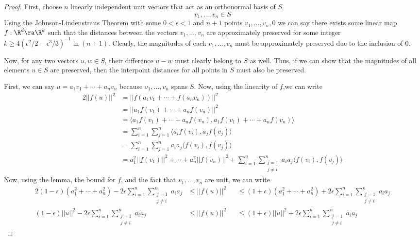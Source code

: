 \documentclass{article}
\newcommand{\innerproduct}[2]{\langle #1, #2 \rangle}
\begin{document}
\begin{proof}
    First, choose $n$ linearly independent unit vectors that act as an orthonormal basis of $S$
    \[v_1,\ldots,v_n \in S \]
    Using the Johnson-Lindenstraus Theorem 
    with some $0 < \epsilon < 1$ and $n+1$ points $v_1,\ldots,v_n,0$
    we can say there exists some linear map $f: \R^d \ra \R^k$ such that the 
    distances between the vectors $v_1,\ldots,v_n$ are approximately preserved for some 
    integer $k \geq 4(\epsilon^2 / 2 - \epsilon^3 / 3)^{-1}\ln{(n+1)}$. Clearly, the 
    magnitudes of each $v_1,\ldots,v_n$ must be approximately preserved due to the inclusion of 0.
    
    Now, for any two vectors $u,w \in S$, their difference $u-w$ must clearly belong to $S$ 
    as well. Thus, if we can show that the magnitudes of all elements $u \in S$ are preserved,
    then the interpoint distances for all points in $S$ must also be preserved. 
    
    First, we can say $u = a_1v_1 + \cdots + a_{n}v_n$ because $v_1,\ldots,v_n$ spans $S$. Now, 
    using the linearity of $f$,we can write
    \begin{alignat*}{2}
        ||f(u)||^2 &= ||f(a_1v_1 + \cdots + f(a_{n}v_n))||^2 \\
        &= ||a_1f(v_1) + \cdots + a_{n}f(v_n)||^2 \\
        &= \innerproduct{a_1f(v_1) + \cdots + a_{n}f(v_n)}{a_1f(v_1) + \cdots + a_{n}f(v_n)} \\
        &= \sum_{i=1}^{n}\sum_{j=1}^{n}\innerproduct{a_{i}f(v_i)}{a_{j}f(v_j)} \\
        &= \sum_{i=1}^{n}\sum_{j=1}^{n}a_{i}a_{j}\innerproduct{f(v_i)}{f(v_j)} \\
        &= a_1^2||f(v_1)||^2 + \cdots + a_n^2||f(v_n)||^2 + \sum_{i=1}^{n}\sum_{\substack{j=1 \\ j \neq i}}^{n}a_{i}a_{j}\innerproduct{f(v_i)}{f(v_j)}
    \end{alignat*}
    Now, using the lemma, the bound for $f$, and the fact that $v_1,\ldots,v_n$ are unit, we can write
    \begin{alignat*}{2}
        (1-\epsilon)(a_1^2 + \cdots + a_n^2) - 2\epsilon\sum_{i=1}^{n}\sum_{\substack{j=1 \\ j \neq i}}^{n}a_{i}a_{j} &\leq ||f(u)||^2 &&\leq (1+\epsilon)(a_1^2 + \cdots + a_n^2) + 2\epsilon\sum_{i=1}^{n}\sum_{\substack{j=1 \\ j \neq i}}^{n}a_{i}a_{j}\\
        (1-\epsilon)||u||^2- 2\epsilon\sum_{i=1}^{n}\sum_{\substack{j=1 \\ j \neq i}}^{n}a_{i}a_{j} &\leq ||f(u)||^2 &&\leq (1+\epsilon)||u||^2 + 2\epsilon\sum_{i=1}^{n}\sum_{\substack{j=1 \\ j \neq i}}^{n}a_{i}a_{j}
    \end{alignat*}


\end{proof}
\end{document}
